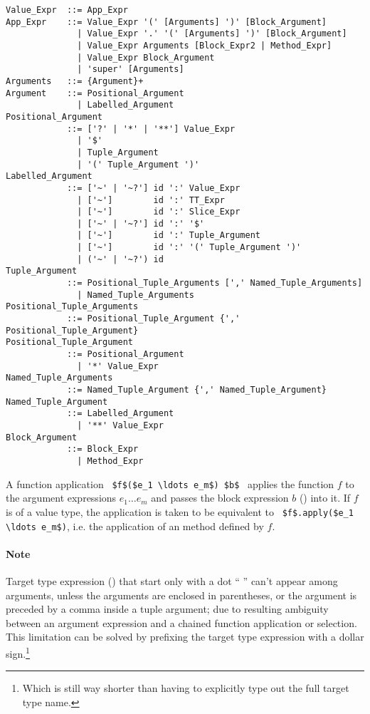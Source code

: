 \syntax\begin{lstlisting}[mathescape=false]
Value_Expr  ::= App_Expr
App_Expr    ::= Value_Expr '(' [Arguments] ')' [Block_Argument]
              | Value_Expr '.' '(' [Arguments] ')' [Block_Argument]
              | Value_Expr Arguments [Block_Expr2 | Method_Expr]
              | Value_Expr Block_Argument
              | 'super' [Arguments]
Arguments   ::= {Argument}+
Argument    ::= Positional_Argument
              | Labelled_Argument
Positional_Argument 
            ::= ['?' | '*' | '**'] Value_Expr
              | '$'
              | Tuple_Argument
              | '(' Tuple_Argument ')'
Labelled_Argument
            ::= ['~' | '~?'] id ':' Value_Expr
              | ['~']        id ':' TT_Expr
              | ['~']        id ':' Slice_Expr
              | ['~' | '~?'] id ':' '$'
              | ['~']        id ':' Tuple_Argument
              | ['~']        id ':' '(' Tuple_Argument ')'
              | ('~' | '~?') id
Tuple_Argument 
            ::= Positional_Tuple_Arguments [',' Named_Tuple_Arguments]
              | Named_Tuple_Arguments
Positional_Tuple_Arguments 
            ::= Positional_Tuple_Argument {',' Positional_Tuple_Argument}
Positional_Tuple_Argument 
            ::= Positional_Argument
              | '*' Value_Expr
Named_Tuple_Arguments
            ::= Named_Tuple_Argument {',' Named_Tuple_Argument}
Named_Tuple_Argument
            ::= Labelled_Argument
              | '**' Value_Expr
Block_Argument
            ::= Block_Expr 
              | Method_Expr
\end{lstlisting}

A function application ~\lstinline!$f$($e_1 \ldots e_m$) $b$!~ applies the function $f$ to the argument expressions $e_1 \ldots e_m$ and passes the block expression $b$ () into it. If $f$ is of a value type, the application is taken to be equivalent to ~\lstinline!$f$.apply($e_1 \ldots e_m$)!, i.e. the application of an  method defined by $f$. 

\paragraph{Note}
Target type expression () that start only with a dot ``\,\,'' can't appear among arguments, unless the arguments are enclosed in parentheses, or the argument is preceded by a comma inside a tuple argument; due to resulting ambiguity between an argument expression and a chained function application or selection. This limitation can be solved by prefixing the target type expression with a dollar sign.\footnote{Which is still way shorter than having to explicitly type out the full target type name.}





